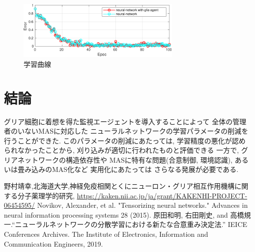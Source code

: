 \documentclass[a4paper,10.5pt,twocolumn]{jsarticle}
\begin{document}
\vspace{-2zh}
\begin{figure}[H]
  \centering
  \includegraphics[width=8cm]{LearningCurve-crop.pdf} 
  \caption{学習曲線}
  \label{fig:LearningCurve}
\end{figure}
 
\section{結論}
グリア細胞に着想を得た監視エージェントを導入することによって
全体の管理者のいないMASに対応した
ニューラルネットワークの学習パラメータの削減を行うことができた.
このパラメータの削減にあたっては, 学習精度の悪化が認められなかったことから, 
刈り込みが適切に行われたものと評価できる
一方で, グリアネットワークの構造依存性や
MASに特有な問題(合意制御, 環境認識), あるいは畳み込みのMAS化など
実用化にあたっては
さらなる発展が必要である.
 \begin{thebibliography}{99}
野村靖幸,北海道大学,神経免疫相関とくにニューロン・グリア相互作用機構に関する分子薬理学的研究, \url{https://kaken.nii.ac.jp/ja/grant/KAKENHI-PROJECT-06454595/}
  Novikov, Alexander, et al. "Tensorizing neural networks." Advances in neural information processing systems 28 (2015).
  原田和明, 右田剛史, and 高橋規一.``ニューラルネットワークの分散学習における新たな合意重み決定法.'' IEICE Conferences Archives. The Institute of Electronics, Information and Communication Engineers, 2019.
\end{thebibliography}
 
\end{document}
